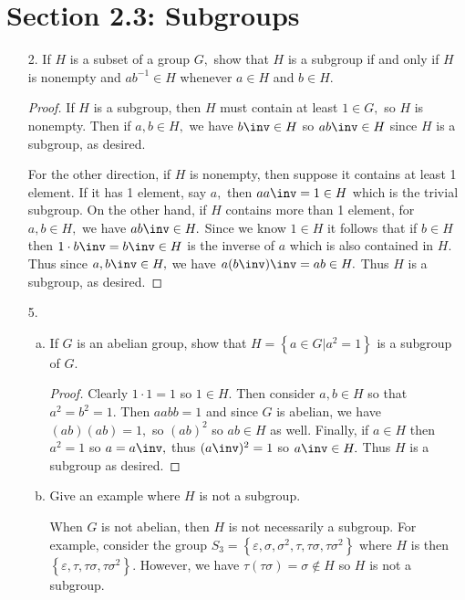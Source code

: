 \documentclass{article}
\begin{document}
\section*{Section 2.3: Subgroups}
\begin{itemize}
	\item[2.] If $H$ is a subset of a group $G,$ show that $H$ is a subgroup if and only if $H$ is nonempty and $ab^{-1}\in H$ whenever $a\in H$ and $b\in H.$
		\begin{proof}
			If $H$ is a subgroup, then $H$ must contain at least $1\in G,$ so $H$ is nonempty. Then if $a, b\in H,$ we have $b\inv\in H$ so $ab\inv\in H$ since $H$ is a subgroup, as desired.

			For the other direction, if $H$ is nonempty, then suppose it contains at least 1 element. If it has 1 element, say $a,$ then $aa\inv=1\in H$ which is the trivial subgroup. On the other hand, if $H$ contains more than 1 element, for $a, b\in H,$ we have $ab\inv\in H.$ Since we know $1\in H$ it follows that if $b\in H$ then $1\cdot b\inv=b\inv\in H$ is the inverse of $a$ which is also contained in $H.$ Thus since $a, b\inv\in H,$ we have $a(b\inv)\inv=ab\in H.$ Thus $H$ is a subgroup, as desired.
			
		\end{proof}

		\newpage
	\item[5.] 
		\begin{enumerate}[(a)]
			\item If $G$ is an abelian group, show that $H=\left\{ a\in G | a^2=1 \right\}$ is a subgroup of $G.$
				\begin{proof}
					Clearly $1\cdot1=1$ so $1\in H.$ Then consider $a, b\in H$ so that $a^2=b^2=1.$ Then $aabb=1$ and since $G$ is abelian, we have $(ab)(ab)=1,$ so $(ab)^2$ so $ab\in H$ as well. Finally, if $a\in H$ then $a^2=1$ so $a=a\inv,$ thus $(a\inv)^2=1$ so $a\inv\in H.$ Thus $H$ is a subgroup as desired.

				\end{proof}

			\item Give an example where $H$ is not a subgroup.
				
				\begin{soln}
					When $G$ is not abelian, then $H$ is not necessarily a subgroup. For example, consider the group $S_3=\left\{ \varepsilon, \sigma, \sigma^2, \tau, \tau\sigma, \tau\sigma^2 \right\}$ where $H$ is then $\left\{ \varepsilon, \tau, \tau\sigma, \tau\sigma^2 \right\}.$ However, we have $\tau(\tau\sigma)=\sigma\not\in H$ so $H$ is not a subgroup.


\end{soln}
\end{enumerate}
\end{itemize}
\end{document}
